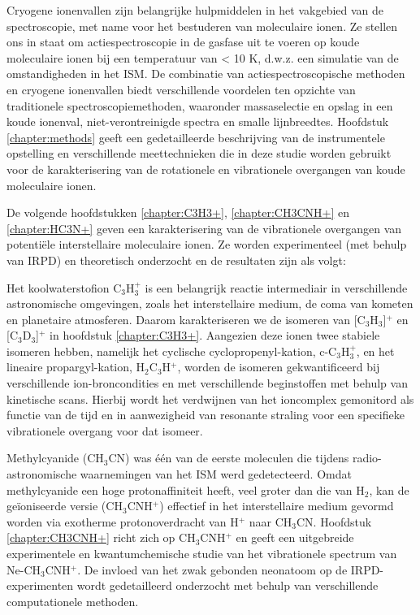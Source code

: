 {Cryogene ionenvallen zijn belangrijke hulpmiddelen in het vakgebied van de spectroscopie, met name voor het bestuderen van moleculaire ionen. Ze stellen ons in staat om actiespectroscopie in de gasfase uit te voeren op koude moleculaire ionen bij een temperatuur van < 10 K, d.w.z. een simulatie van de omstandigheden in het ISM. De combinatie van actiespectroscopische methoden en cryogene ionenvallen biedt verschillende voordelen ten opzichte van traditionele spectroscopiemethoden, waaronder massaselectie en opslag in een koude ionenval, niet-verontreinigde spectra en smalle lijnbreedtes. Hoofdstuk \ref{chapter:methods} geeft een gedetailleerde beschrijving van de instrumentele opstelling en verschillende meettechnieken die in deze studie worden gebruikt voor de karakterisering van de rotationele en vibrationele overgangen van koude moleculaire ionen.

De volgende hoofdstukken \ref{chapter:C3H3+}, \ref{chapter:CH3CNH+} en \ref{chapter:HC3N+} geven een karakterisering van de vibrationele overgangen van potentiële interstellaire moleculaire ionen. Ze worden experimenteel (met behulp van IRPD) en theoretisch onderzocht en de resultaten zijn als volgt:

Het koolwaterstofion C$_3$H$_3^+$ is een belangrijk reactie intermediair in verschillende astronomische omgevingen, zoals het 
interstellaire medium, de coma van kometen en planetaire atmosferen. Daarom karakteriseren we de isomeren van 
[C$_3$H$_3$]$^+$ en [C$_3$D$_3$]$^+$ in hoofdstuk \ref{chapter:C3H3+}. Aangezien deze ionen twee stabiele isomeren hebben, namelijk het 
cyclische cyclopropenyl-kation, c-C$_3$H$_3^+$, en het lineaire propargyl-kation, H$_2$C$_3$H$^+$, worden de isomeren 
gekwantificeerd bij verschillende ion-broncondities en met verschillende beginstoffen met behulp van kinetische 
scans. Hierbij wordt het verdwijnen van het ioncomplex gemonitord als functie van de tijd en in aanwezigheid van 
resonante straling voor een specifieke vibrationele overgang voor dat isomeer.

Methylcyanide (CH$_3$CN) was \'{e}\'{e}n van de eerste moleculen die tijdens radio-astronomische waarnemingen van het ISM werd gedetecteerd. Omdat methylcyanide een hoge protonaffiniteit heeft, veel groter dan die van H$_2$, kan de geïoniseerde versie (CH$_3$CNH$^+$) effectief in het interstellaire medium gevormd worden via exotherme protonoverdracht van H$^+$ naar CH$_3$CN.
Hoofdstuk \ref{chapter:CH3CNH+} richt zich op CH$_3$CNH$^+$ en geeft een uitgebreide experimentele en kwantumchemische studie van het vibrationele spectrum van Ne-CH$_3$CNH$^+$. De invloed van het zwak gebonden neonatoom op de IRPD-experimenten wordt gedetailleerd onderzocht met behulp van verschillende computationele methoden.

}
